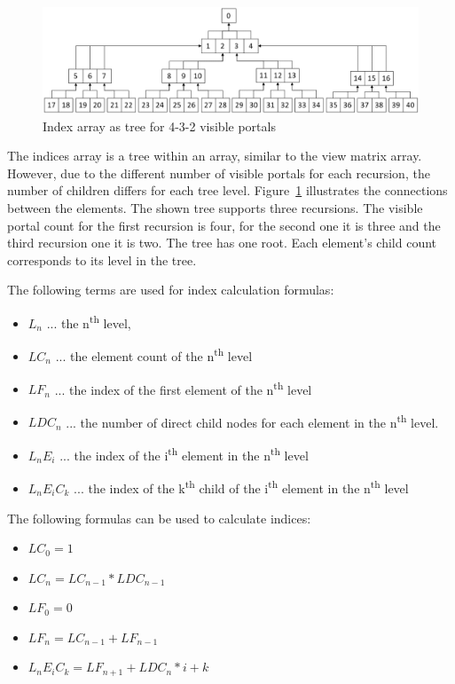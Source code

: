 \begin{figure}[h]
	\includegraphics[width=\linewidth]{images/indexarray.png}
	\caption{Index array as tree for 4-3-2 visible portals}
	\label{fig:indexarray}
\end{figure}

The indices array is a tree within an array, similar to the view matrix array. However, due to the different number of visible portals for each recursion, the number of children differs for each tree level. Figure~\ref{fig:indexarray} illustrates the connections between the elements. The shown tree supports three recursions. The visible portal count for the first recursion is four, for the second one it is three and the third recursion one it is two. The tree has one root. Each element's child count corresponds to its level in the tree.

The following terms are used for index calculation formulas:
\begin{itemize}
	\item $L_n$ ... the n\textsuperscript{th} level,
	\item $LC_n$ ... the element count of the n\textsuperscript{th} level
	\item $LF_n$ ... the index of the first element of the n\textsuperscript{th} level
	\item $LDC_n$ ... the number of direct child nodes for each element in the n\textsuperscript{th} level. 
	\item $L_nE_i$ ... the index of the i\textsuperscript{th} element in the n\textsuperscript{th} level
	\item $L_nE_iC_k$ ... the index of the k\textsuperscript{th} child of the i\textsuperscript{th} element in the n\textsuperscript{th} level 
\end{itemize}

The following formulas can be used to calculate indices:

\begin{itemize}
	\item $LC_0 = 1$
	\item $LC_n = LC_{n-1} * LDC_{n-1}$
	\item $LF_0 = 0$
	\item $LF_n = LC_{n-1} + LF_{n-1}$
	\item $L_nE_iC_k = LF_{n+1} + LDC_{n} * i + k$
\end{itemize}

